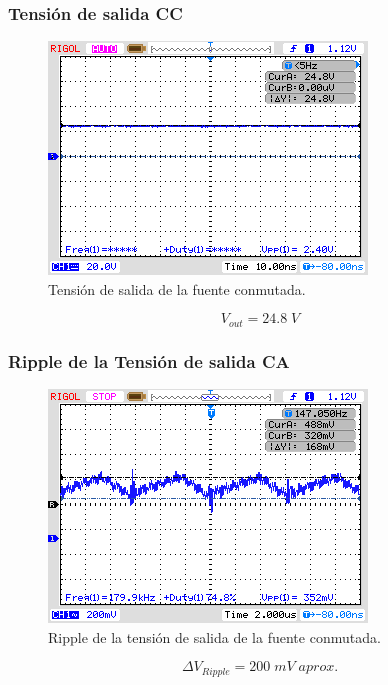 \documentclass[11pt, a4paper]{article}
\begin{document}
\subsubsection{Tensión de salida CC}
\begin{figure}[H]
	\centering
	\includegraphics[width = 8 cm]{Imagenes/Vout}
	\caption{Tensión de salida de la fuente conmutada.}
	\label{Vo}
\end{figure}
\[V_{out} = 24.8 \; V\]

\subsubsection{Ripple de la Tensión de salida CA}
\begin{figure}[H]
	\centering
	\includegraphics[width = 8 cm]{Imagenes/Ripple}
	\caption{Ripple de la tensión de salida de la fuente conmutada.}
	\label{Ripple}
\end{figure}
\[\Delta V_{Ripple} = 200 \; mV \; aprox.\]
\end{document}
